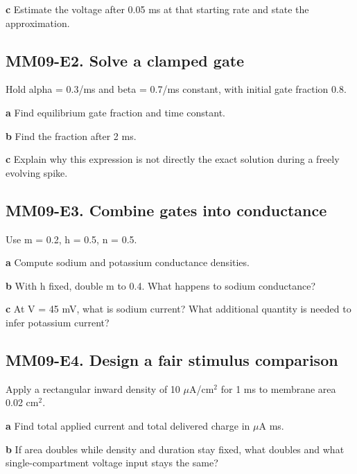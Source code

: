\documentclass[11pt,letterpaper]{article}
\theoremstyle{definition}\newtheorem{definition}{Definition}\newtheorem{example}{Example}
\numberwithin{equation}{section}
\begin{document}
\textbf{c} Estimate the voltage after 0.05 ms at that starting rate and state the approximation.

\par\noindent\begin{minipage}{\linewidth}
\subsection*{MM09-E2. Solve a clamped gate}
Hold alpha =\allowbreak{} 0.3/ms and beta =\allowbreak{} 0.7/ms constant, with initial gate fraction 0.8.

\textbf{a} Find equilibrium gate fraction and time constant.

\end{minipage}\par\medskip
\textbf{b} Find the fraction after 2 ms.

\textbf{c} Explain why this expression is not directly the exact solution during a freely evolving spike.

\par\noindent\begin{minipage}{\linewidth}
\subsection*{MM09-E3. Combine gates into conductance}
Use m =\allowbreak{} 0.2, h =\allowbreak{} 0.5, n =\allowbreak{} 0.5.

\textbf{a} Compute sodium and potassium conductance densities.

\end{minipage}\par\medskip
\textbf{b} With h fixed, double m to 0.4. What happens to sodium conductance?

\textbf{c} At V =\allowbreak{} 45 mV, what is sodium current? What additional quantity is needed to infer potassium current?

\par\noindent\begin{minipage}{\linewidth}
\subsection*{MM09-E4. Design a fair stimulus comparison}
Apply a rectangular inward density of 10 $\mu$A/cm$^2$ for 1 ms to membrane area 0.02 cm$^2$.

\textbf{a} Find total applied current and total delivered charge in $\mu$A ms.

\end{minipage}\par\medskip
\textbf{b} If area doubles while density and duration stay fixed, what doubles and what single-compartment voltage input stays the same?
\end{document}
